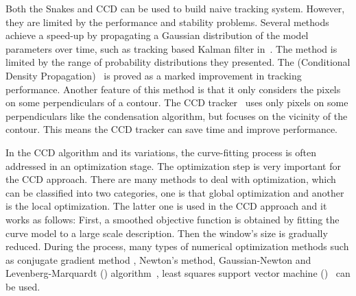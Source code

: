 Both the Snakes and CCD can be used to build naive tracking
system. However, they are limited by the performance and stability
problems. Several methods achieve a speed-up by propagating a Gaussian
distribution of the model parameters over time, such as tracking based
Kalman filter in~\cite{brookner1998tracking}. The method is limited by the range of probability
distributions they presented. The  (Conditional
Density Propagation)~\cite{isard1998icondensation} is proved as a marked improvement in tracking performance. Another feature of
this method is that it only considers the pixels on some
perpendiculars of a contour. The CCD tracker~\cite{hanek2004fitting} uses only
pixels on some perpendiculars like the condensation algorithm, but
focuses on the vicinity of the contour. This means the CCD tracker can
save time and improve performance.

In the CCD algorithm and its variations, the curve-fitting process is
often addressed in an optimization stage. The optimization step is
very important for the CCD approach. There are many methods to
deal with optimization, which can be classified into two
categories, one is that global optimization and another is the local
optimization. The latter one is used in the CCD
approach and it works as follows: First, a smoothed objective function is obtained by fitting
the curve model to a large scale description. Then the window's size is
gradually reduced. During the process, many types of  numerical
optimization methods such as  conjugate gradient method , Newton's
method, Gaussian-Newton and Levenberg-Marquardt
()
algorithm~\cite{contourpanin2011}, least squares support vector
machine ()~\cite{vapnik2000nature} can be used.
